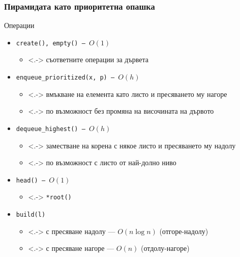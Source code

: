 \documentclass{beamer}
\begin{document}
\begin{frame}
  \frametitle{Пирамидата като приоритетна опашка}

  Операции
  \begin{itemize}[<+->]
  \item \tt{create()}, \tt{empty()} --- $O(1)$
    \begin{itemize}
    \item<.-> съответните операции за дървета
    \end{itemize}
  \item \tt{enqueue\_prioritized(x, p)} --- $O(h)$
    \begin{itemize}
    \item<.-> вмъкване на елемента като листо и пресяването му нагоре
    \item<.-> по възможност без промяна на височината на дървото
    \end{itemize}
  \item \tt{dequeue\_highest()} --- $O(h)$
    \begin{itemize}
    \item<.-> заместване на корена с някое листо и пресяването му надолу
    \item<.-> по възможност с листо от най-долно ниво
    \end{itemize}
  \item \tt{head()} --- $O(1)$
    \begin{itemize}
    \item<.-> \tt{*root()}
    \end{itemize}
  \item \tt{build(l)}
    \begin{itemize}
    \item<.-> с пресяване надолу --- $O(n\log n)$ (отгоре-надолу)
    \item<.-> с пресяване нагоре  --- $O(n)$ (отдолу-нагоре)
    \end{itemize}
  \end{itemize}
\end{frame}
\end{document}
